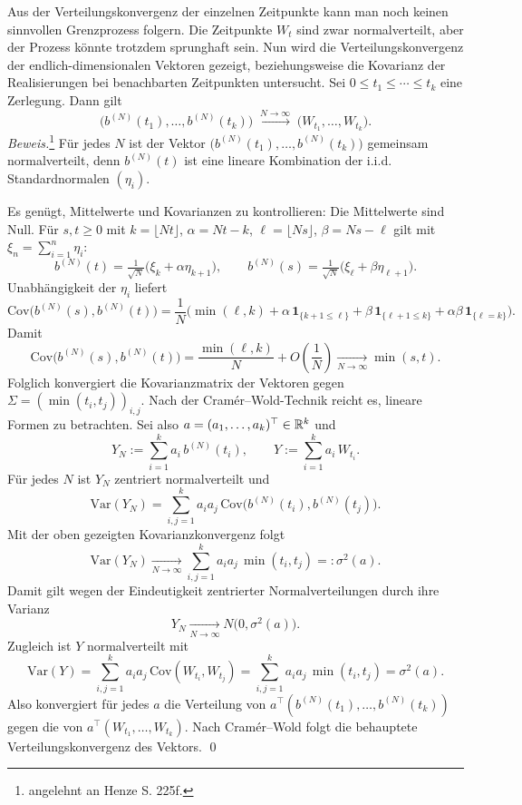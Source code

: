 \begin{satz}
Aus der Verteilungskonvergenz der einzelnen Zeitpunkte kann man noch keinen sinnvollen Grenzprozess folgern.
Die Zeitpunkte $W_t$ sind zwar normalverteilt, aber der Prozess könnte trotzdem sprunghaft sein.
Nun wird die Verteilungskonvergenz der endlich-dimensionalen Vektoren gezeigt, beziehungsweise
die Kovarianz der Realisierungen bei benachbarten Zeitpunkten untersucht.
Sei $0\le t_1\le\cdots\le t_k$ eine Zerlegung. Dann gilt
$$
\big(b^{(N)}(t_1), \dots , b^{(N)}(t_k) \big )\;\xrightarrow{N\to\infty}{}\;\big(W_{t_1},\dots,W_{t_k}\big).
$$
\textit{Beweis.}\footnote{angelehnt an Henze \cite{henze} S. 225f.}
Für jedes $N$ ist der Vektor $\big(b^{(N)}(t_1),\dots,b^{(N)}(t_k)\big)$ gemeinsam normalverteilt,
denn $b^{(N)}(t)$ ist eine lineare Kombination der i.i.d. Standardnormalen $(\eta_i)$.

Es genügt, Mittelwerte und Kovarianzen zu kontrollieren:
Die Mittelwerte sind Null. Für $s,t\ge0$ mit $k=\lfloor Nt\rfloor$, $\alpha=Nt-k$, 
$\ell=\lfloor Ns\rfloor$, $\beta=Ns-\ell$ gilt mit $\xi_n=\sum_{i=1}^n\eta_i$:
$$
b^{(N)}(t)=\tfrac1{\sqrt N}\big(\xi_k+\alpha\eta_{k+1}\big),\qquad
b^{(N)}(s)=\tfrac1{\sqrt N}\big(\xi_\ell+\beta\eta_{\ell+1}\big).
$$
Unabhängigkeit der $\eta_i$ liefert
$$
\mathrm{Cov}\!\big(b^{(N)}(s),b^{(N)}(t)\big)
=\frac1N\Big(\min(\ell,k)+\alpha\,\mathbf 1_{\{k+1\le \ell\}}+\beta\,\mathbf 1_{\{\ell+1\le k\}}+\alpha\beta\,\mathbf 1_{\{\ell=k\}}\Big).
$$
Damit
$$
\mathrm{Cov}\!\big(b^{(N)}(s),b^{(N)}(t)\big)
=\frac{\min(\ell,k)}{N}+O\!\left(\frac1N\right)\xrightarrow[N\to\infty]{}\min(s,t).
$$
Folglich konvergiert die Kovarianzmatrix der Vektoren gegen 
$\Sigma=(\min(t_i,t_j))_{i,j}$.
Nach der Cramér–Wold-Technik reicht es, lineare Formen zu betrachten. Sei also $a=(a_1,\dots,a_k)^\top\in\Bbb R^k$ und
$$
Y_N:=\sum_{i=1}^k a_i\,b^{(N)}(t_i),\qquad
Y:=\sum_{i=1}^k a_i\,W_{t_i}.
$$
Für jedes $N$ ist $Y_N$ zentriert normalverteilt und
$$
\mathrm{Var}(Y_N)=\sum_{i,j=1}^k a_i a_j\,\mathrm{Cov}\!\big(b^{(N)}(t_i),b^{(N)}(t_j)\big).
$$
Mit der oben gezeigten Kovarianzkonvergenz folgt
$$
\mathrm{Var}(Y_N)\xrightarrow[N\to\infty]{}\sum_{i,j=1}^k a_i a_j\,\min(t_i,t_j)=:\sigma^2(a).
$$
Damit gilt wegen der Eindeutigkeit zentrierter Normalverteilungen durch ihre Varianz
$$
Y_N \xrightarrow[N\to\infty]{} N\!\big(0,\sigma^2(a)\big).
$$
Zugleich ist $Y$ normalverteilt mit
$$
\mathrm{Var}(Y)=\sum_{i,j=1}^k a_i a_j\,\mathrm{Cov}(W_{t_i},W_{t_j})
=\sum_{i,j=1}^k a_i a_j\,\min(t_i,t_j)=\sigma^2(a).
$$
Also konvergiert für jedes $a$ die Verteilung von $a^\top(b^{(N)}(t_1),\dots,b^{(N)}(t_k))$ gegen die von $a^\top(W_{t_1},\dots,W_{t_k})$.
Nach Cramér–Wold folgt die behauptete Verteilungskonvergenz des Vektors. \qed
\end{satz}

